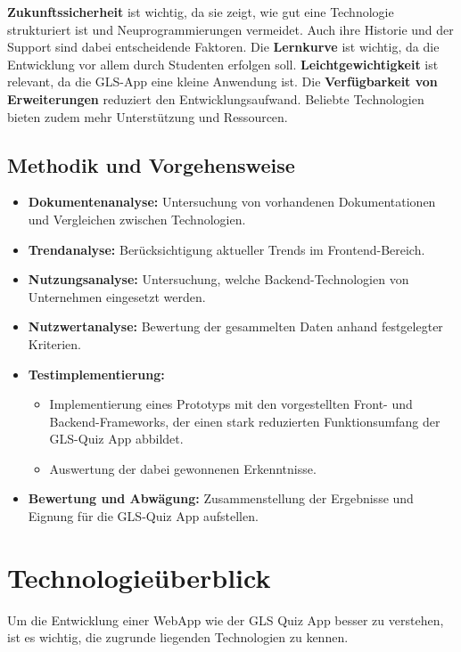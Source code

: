 \documentclass[biblatex]{lni}
\begin{document}
\textbf{Zukunftssicherheit} ist wichtig, da sie zeigt,
wie gut eine Technologie strukturiert ist und Neuprogrammierungen vermeidet.
Auch ihre Historie und der Support sind dabei entscheidende Faktoren.
Die \textbf{Lernkurve} ist wichtig, da die Entwicklung vor allem durch Studenten erfolgen soll.
\textbf{Leichtgewichtigkeit} ist relevant,
da die GLS-App eine kleine Anwendung ist.
Die \textbf{Verfügbarkeit von Erweiterungen} reduziert den Entwicklungsaufwand.
Beliebte Technologien bieten zudem mehr Unterstützung und Ressourcen.

\subsection{Methodik und Vorgehensweise}

\begin{itemize}
  \item \textbf{Dokumentenanalyse:} Untersuchung von vorhandenen Dokumentationen und Vergleichen zwischen Technologien.
  \item \textbf{Trendanalyse:} Berücksichtigung aktueller Trends im Frontend-Bereich.
  \item \textbf{Nutzungsanalyse:} Untersuchung, welche Backend-Technologien von Unternehmen eingesetzt werden.
  \item \textbf{Nutzwertanalyse:} Bewertung der gesammelten Daten anhand festgelegter Kriterien.
  \item \textbf{Testimplementierung:}
  \begin{itemize}
    \item Implementierung eines Prototyps mit den vorgestellten Front- und Backend-Frameworks,
          der einen stark reduzierten Funktionsumfang der GLS-Quiz App abbildet.
    \item Auswertung der dabei gewonnenen Erkenntnisse.
  \end{itemize}
  \item \textbf{Bewertung und Abwägung:} Zusammenstellung der Ergebnisse und Eignung für die GLS-Quiz App aufstellen.
\end{itemize}

\section{Technologieüberblick}
\label{sec:tec-überblick}
Um die Entwicklung einer \ac{WebApp} wie der GLS Quiz App besser zu verstehen,
ist es wichtig, die zugrunde liegenden Technologien zu kennen.
\end{document}
